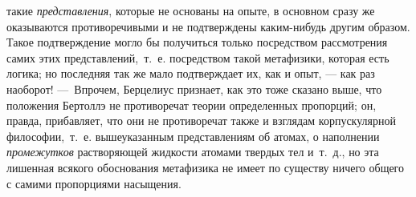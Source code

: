 такие {\em представления}, которые не основаны на
опыте, в основном сразу же оказываются противоречивыми и не подтверждены
каким-нибудь другим образом. Такое подтверждение могло бы получиться только
посредством рассмотрения самих этих представлений,~т.~е. посредством такой
метафизики, которая есть логика; но последняя так же мало подтверждает их,
как и опыт, — как раз наоборот! —~Впрочем, Берцелиус признает, как это тоже
сказано выше, что положения Бертоллэ не противоречат теории определенных
пропорций; он, правда, прибавляет, что они не противоречат также и взглядам
корпускулярной философии,~т.~е. вышеуказанным представлениям об атомах, о
наполнении {\em промежутков} растворяющей жидкости
атомами твердых тел и~т.~д., но эта лишенная всякого обоснования метафизика
не имеет по существу ничего общего с самими пропорциями насыщения.

